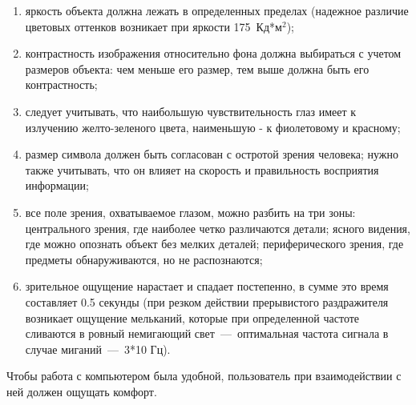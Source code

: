 \documentclass[14pt]{extarticle}
\begin{document}
\begin{enumerate}
	\item яркость объекта должна лежать в определенных пределах (надежное различие цветовых оттенков возникает при яркости 175~Кд*м$^2$);
	\item контрастность изображения относительно фона должна выбираться с учетом размеров объекта: чем меньше его размер, тем выше должна быть его контрастность;
	\item следует учитывать, что наибольшую чувствительность глаз имеет к излучению желто-зеленого цвета, наименьшую - к фиолетовому и красному;
	\item размер символа должен быть согласован с остротой зрения человека; нужно также учитывать, что он влияет на скорость и правильность восприятия информации;
	\item все поле зрения, охватываемое глазом, можно разбить на три зоны: центрального зрения, где наиболее четко различаются детали; ясного видения, где можно опознать объект без мелких деталей; периферического зрения, где предметы обнаруживаются, но не распознаются;
	\item зрительное ощущение нарастает и спадает постепенно, в сумме это время составляет 0.5 секунды (при резком действии прерывистого раздражителя возникает ощущение мельканий, которые при определенной частоте сливаются в ровный немигающий свет~---~оптимальная частота сигнала в случае миганий~---~3*10 Гц).

\end{enumerate}

Чтобы работа с компьютером была удобной, пользователь при взаимодействии с ней должен ощущать комфорт.

\begin{table}[h]
\end{table}
\end{document}
